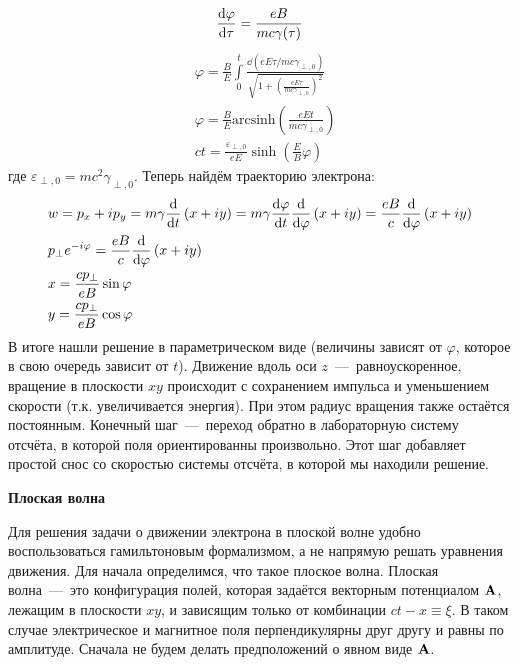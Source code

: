 \documentclass[10pt, a4paper]{article}
\begin{document}
\begin{equation*}
	\dv{\varphi}{\tau} = \frac{eB}{mc\gamma(\tau)}
\end{equation*}
\begin{align*}
	&\varphi = \frac{B}{E}\int\limits_0^{t}\frac{\dd \left(eE\tau / mc\gamma_{\perp,0}\right)}{\sqrt{1 + \left( \frac{eE\tau}{mc\gamma_{\perp,0}} \right)^2}}\\
	&\varphi = \frac{B}{E}\text{arcsinh}\left( \frac{eEt}{mc\gamma_{\perp,0}} \right)\\
	&ct = \frac{\varepsilon_{\perp,0}}{eE}\sinh{\left( \frac{E}{B}\varphi \right)}
\end{align*}
где $\varepsilon_{\perp,0}=mc^2\gamma_{\perp,0}$. Теперь найдём траекторию электрона:
\begin{align*}
	&w = p_x + ip_y = m\gamma \dv{}{t}\left( x + iy \right) = m\gamma\dv{\varphi}{t}\dv{}{\varphi}\left( x + iy \right) = \frac{eB}{c}\dv{}{\varphi}\left( x + iy \right)\\
	&p_\perp e^{-i\varphi} = \frac{eB}{c}\dv{}{\varphi}\left( x + iy \right) \\
	&x = \frac{cp_\perp}{eB}\sin\varphi\\
	&y = \frac{cp_\perp}{eB}\cos\varphi\\
\end{align*}
В итоге нашли решение в параметрическом виде (величины зависят от $\varphi$, которое в свою очередь зависит от $t$). Движение вдоль оси $z$~---~равноускоренное, вращение в плоскости $xy$ происходит с сохранением импульса и уменьшением скорости (т.к. увеличивается энергия). При этом радиус вращения также остаётся постоянным. Конечный шаг~---~переход обратно в лабораторную систему отсчёта, в которой поля ориентированны произвольно. Этот шаг добавляет простой снос со скоростью системы отсчёта, в которой мы находили решение.

\vspace{5mm}
\textbf{Плоская волна}

Для решения задачи о движении электрона в плоской волне удобно воспользоваться гамильтоновым формализмом, а не напрямую решать уравнения движения. Для начала определимся, что такое плоское волна. Плоская волна~---~это конфигурация полей, которая задаётся векторным потенциалом $\vb{A}$, лежащим в плоскости $xy$, и зависящим только от комбинации $ct - x \equiv \xi$. В таком случае электрическое и магнитное поля перпендикулярны друг другу и равны по амплитуде. Сначала не будем делать предположений о явном виде $\vb{A}$.
\end{document}
